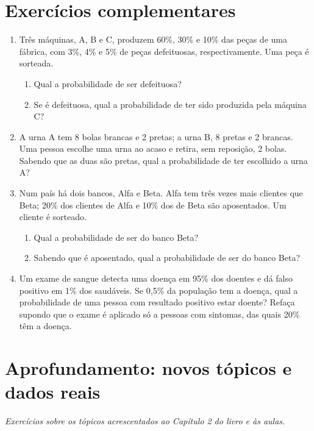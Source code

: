 \documentclass[11pt]{article}
\begin{document}
\bigskip
\section*{Exercícios complementares}

\begin{enumerate}[label=\textbf{C\arabic*.}, leftmargin=*]
\item Três máquinas, A, B e C, produzem 60\%, 30\% e 10\% das peças de uma fábrica, com 3\%, 4\% e 5\% de peças defeituosas, respectivamente. Uma peça é sorteada.
\begin{enumerate}[label=(\alph*)]
  \item Qual a probabilidade de ser defeituosa?
  \item Se é defeituosa, qual a probabilidade de ter sido produzida pela máquina C?
\end{enumerate}
\item A urna A tem 8 bolas brancas e 2 pretas; a urna B, 8 pretas e 2 brancas. Uma pessoa escolhe uma urna ao acaso e retira, sem reposição, 2 bolas. Sabendo que as duas são pretas, qual a probabilidade de ter escolhido a urna A?
\item Num país há dois bancos, Alfa e Beta. Alfa tem três vezes mais clientes que Beta; 20\% dos clientes de Alfa e 10\% dos de Beta são aposentados. Um cliente é sorteado.
\begin{enumerate}[label=(\alph*)]
  \item Qual a probabilidade de ser do banco Beta?
  \item Sabendo que é aposentado, qual a probabilidade de ser do banco Beta?
\end{enumerate}
\item Um exame de sangue detecta uma doença em 95\% dos doentes e dá falso positivo em 1\% dos saudáveis. Se 0,5\% da população tem a doença, qual a probabilidade de uma pessoa com resultado positivo estar doente? Refaça supondo que o exame é aplicado só a pessoas com sintomas, das quais 20\% têm a doença.

\end{enumerate}

\bigskip
{}
\section*{Aprofundamento: novos tópicos e dados reais}
\noindent\textit{Exercícios sobre os tópicos acrescentados ao Capítulo 2 do livro e às aulas.}
\end{document}
